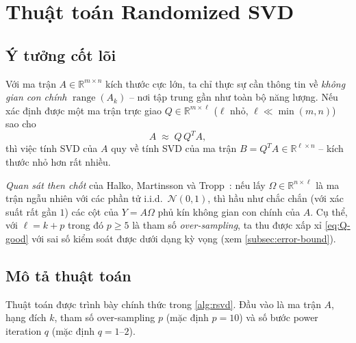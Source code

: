 \section{Thuật toán Randomized SVD}\label{sec:algorithm}

\subsection{Ý tưởng cốt lõi}\label{subsec:rsvd-idea}

Với ma trận $A \in \mathbb{R}^{m\times n}$ kích thước cực lớn, ta chỉ thực sự
cần thông tin về \emph{không gian con chính} $\operatorname{range}(A_k)$ --
nơi tập trung gần như toàn bộ năng lượng. Nếu xác định được một ma trận
trực giao $Q \in \mathbb{R}^{m\times \ell}$ ($\ell$ nhỏ, $\ell \ll \min(m,n)$)
sao cho
\begin{equation}\label{eq:Q-good}
    A \;\approx\; Q\, Q^T A,
\end{equation}
thì việc tính SVD của $A$ quy về tính SVD của ma trận
$B = Q^T A \in \mathbb{R}^{\ell\times n}$ -- kích thước nhỏ hơn rất nhiều.

\emph{Quan sát then chốt} của Halko, Martinsson và Tropp~\cite{halko2011}:
nếu lấy $\Omega \in \mathbb{R}^{n\times \ell}$ là ma trận ngẫu nhiên với các
phần tử i.i.d.\ $\mathcal{N}(0, 1)$, thì hầu như chắc chắn (với xác suất rất
gần $1$) các cột của $Y = A\Omega$ phủ kín không gian con chính của $A$. Cụ
thể, với $\ell = k + p$ trong đó $p \ge 5$ là tham số \emph{over-sampling},
ta thu được xấp xỉ \eqref{eq:Q-good} với sai số kiểm soát được dưới dạng kỳ
vọng (xem \cref{subsec:error-bound}).

\subsection{Mô tả thuật toán}\label{subsec:rsvd-pseudocode}

Thuật toán được trình bày chính thức trong \cref{alg:rsvd}. Đầu vào là ma trận
$A$, hạng đích $k$, tham số over-sampling $p$ (mặc định $p = 10$) và số bước
power iteration $q$ (mặc định $q = 1$--$2$).

